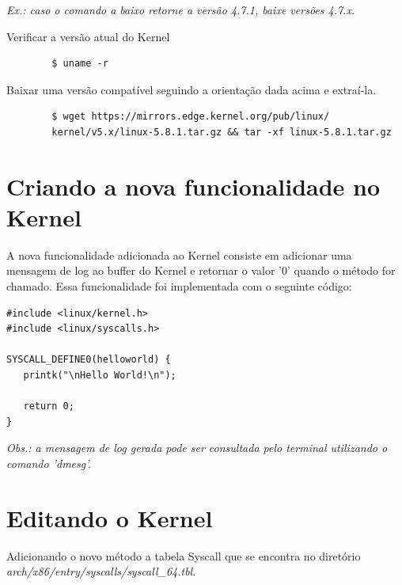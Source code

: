 \documentclass[12pt, a4paper]{article}
\begin{document}
	\par \textit{Ex.: caso o comando a baixo retorne a versão 4.7.1, baixe versões 4.7.x}.
	
	\vspace{\baselineskip}
	
	\par Verificar a versão atual do Kernel
	
	\begin{verbatim}
	    $ uname -r
	\end{verbatim}
	
	\par Baixar uma versão compatível seguindo a orientação dada acima e extraí-la.
	
	\begin{verbatim}
	    $ wget https://mirrors.edge.kernel.org/pub/linux/
	    kernel/v5.x/linux-5.8.1.tar.gz && tar -xf linux-5.8.1.tar.gz
	\end{verbatim}
	
	\section{Criando a nova funcionalidade no Kernel}
	
	\par A nova funcionalidade adicionada ao Kernel consiste em adicionar uma mensagem de log ao buffer do Kernel e retornar o valor '0' quando o método for chamado. Essa funcionalidade foi implementada com o seguinte código:
	
	\vspace{\baselineskip}
	
	\begin{lstlisting}
#include <linux/kernel.h>
#include <linux/syscalls.h>

SYSCALL_DEFINE0(helloworld) {
   printk("\nHello World!\n");

   return 0;
}
    \end{lstlisting}
	
	\par \textit{Obs.: a mensagem de log gerada pode ser consultada pelo terminal utilizando o comando 'dmesg'.}
	
	\section{Editando o Kernel}
	
	\par Adicionando o novo método a tabela Syscall que se encontra no diretório \\ \textit{arch/x86/entry/syscalls/syscall\_64.tbl}.
	
\end{document}

